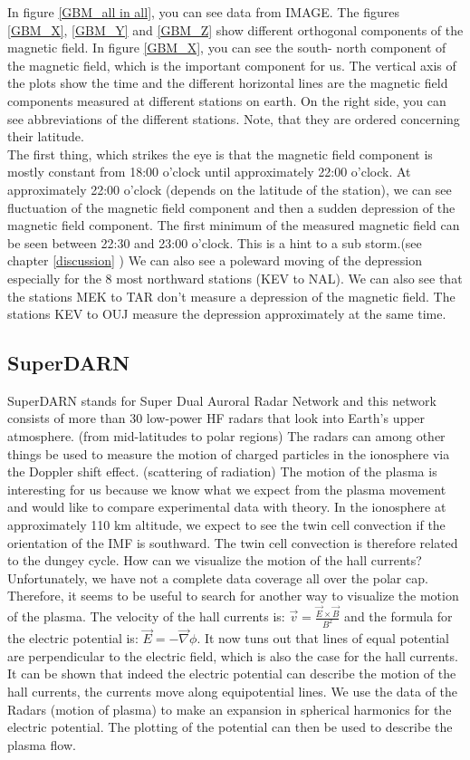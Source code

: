 \documentclass[10pt,a4paper]{article}
\begin{document}
In figure \ref{GBM_all in all}, you can see data from IMAGE. The figures \ref{GBM_X}, \ref{GBM_Y} and \ref{GBM_Z} show different orthogonal components of the magnetic 
field. In figure \ref{GBM_X}, you can see the south- north component of the magnetic field, which is the important component for us. The vertical axis of the plots 
show the time and the different horizontal lines are the magnetic field components measured at different stations on earth. On the right side, you can see abbreviations of the different stations. Note, that they are ordered concerning their latitude. \\
The first thing, which strikes the eye is that the magnetic field component is mostly constant from 18:00 o'clock until approximately 22:00 o'clock. At approximately 22:00 o'clock (depends on the latitude of the station), we can see fluctuation of the magnetic field component and then a sudden depression of the magnetic field component. The first minimum of the measured magnetic field can be seen between 22:30 and 23:00 o'clock.
This is a hint to a sub storm.(see chapter \ref{discussion} ) We can also see a poleward moving of the depression especially for the 8 most northward stations (KEV to NAL). We can also see that the stations MEK to TAR don't measure a depression of the magnetic field. The stations KEV to OUJ measure the depression approximately at the same time. 

\clearpage

\subsection{SuperDARN \label{0_CHAPTER_SUPERDARN}}
SuperDARN stands for  Super Dual Auroral Radar Network and this network consists of more than 30 low-power HF radars that look into Earth's upper atmosphere. 
(from mid-latitudes to polar regions) The radars can among other things be used to measure the motion of charged particles in the ionosphere via the Doppler shift effect. 
(scattering of radiation) The motion of the plasma is interesting for us because we know what we expect from the plasma movement and would like to compare experimental data 
with theory. In the ionosphere at approximately 110 km altitude, we expect to see the twin cell convection if the orientation of the IMF is southward. The twin cell convection is therefore related to the dungey cycle. 
How can we visualize the motion of the hall currents? Unfortunately, we have not a complete data coverage all over the polar cap. Therefore, it seems to be useful 
to search for another way to visualize the motion of the plasma. The velocity of the hall currents is: $\vec{v}=\frac{\vec{E}\times \vec{B}}{B^2}$ and the formula for 
the electric potential is: $\vec{E}=-\vec{\nabla} \phi$. It now tuns out that lines of equal potential are perpendicular to the electric field, which is also the case 
for the hall currents. It can be shown that indeed the electric potential can describe the motion of the hall currents, the currents move along equipotential lines. 
We use the data of the Radars (motion of plasma) to make an expansion in spherical harmonics for the electric potential. The plotting of the potential can then be used 
to describe the plasma flow. 
\end{document}
